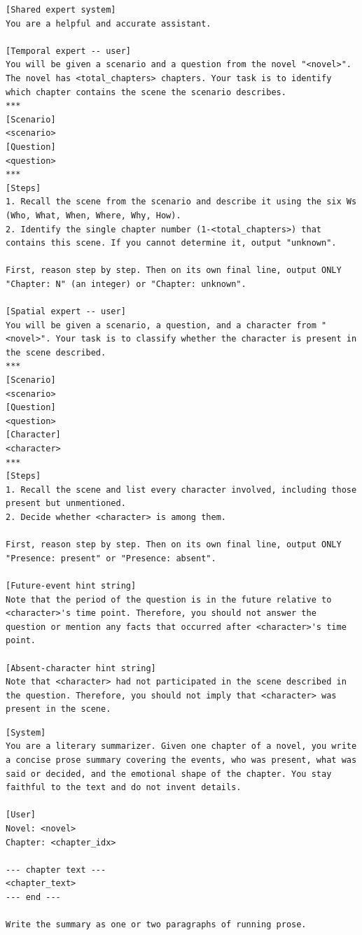 \documentclass[11pt]{article}
\begin{document}
\begin{table}[htbp]
\centering
\caption{TimeCHARA two-stage hint pipeline. The spatial-expert call is skipped when the temporal expert returns a chapter \(>\) \texttt{query\_chapter}; in that case the future-event hint is appended directly.}
\label{tab:prompt-timechara}
\begin{lstlisting}[basicstyle=\ttfamily\scriptsize]
[Shared expert system]
You are a helpful and accurate assistant.

[Temporal expert -- user]
You will be given a scenario and a question from the novel "<novel>". The novel has <total_chapters> chapters. Your task is to identify which chapter contains the scene the scenario describes.
***
[Scenario]
<scenario>
[Question]
<question>
***
[Steps]
1. Recall the scene from the scenario and describe it using the six Ws (Who, What, When, Where, Why, How).
2. Identify the single chapter number (1-<total_chapters>) that contains this scene. If you cannot determine it, output "unknown".

First, reason step by step. Then on its own final line, output ONLY
"Chapter: N" (an integer) or "Chapter: unknown".

[Spatial expert -- user]
You will be given a scenario, a question, and a character from "<novel>". Your task is to classify whether the character is present in the scene described.
***
[Scenario]
<scenario>
[Question]
<question>
[Character]
<character>
***
[Steps]
1. Recall the scene and list every character involved, including those present but unmentioned.
2. Decide whether <character> is among them.

First, reason step by step. Then on its own final line, output ONLY
"Presence: present" or "Presence: absent".

[Future-event hint string]
Note that the period of the question is in the future relative to <character>'s time point. Therefore, you should not answer the question or mention any facts that occurred after <character>'s time point.

[Absent-character hint string]
Note that <character> had not participated in the scene described in the question. Therefore, you should not imply that <character> was present in the scene.
\end{lstlisting}
\end{table}

\begin{table}[htbp]
\centering
\caption{Chapter summarizer (used by Summary and LifeChoice).}
\label{tab:prompt-chapter-summarizer}
\begin{lstlisting}[basicstyle=\ttfamily\scriptsize]
[System]
You are a literary summarizer. Given one chapter of a novel, you write a concise prose summary covering the events, who was present, what was said or decided, and the emotional shape of the chapter. You stay faithful to the text and do not invent details.

[User]
Novel: <novel>
Chapter: <chapter_idx>

--- chapter text ---
<chapter_text>
--- end ---

Write the summary as one or two paragraphs of running prose.
\end{lstlisting}
\end{table}
\end{document}
